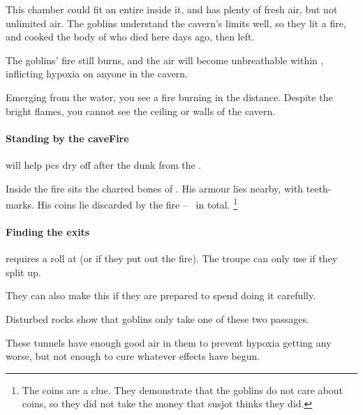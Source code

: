 \begin{multicols}{2}

\begin{exampletext}
  This chamber could fit an entire  inside it, and has plenty of fresh air, but not unlimited air.
  The goblins understand the cavern's limits well, so they lit a fire, and cooked the body of  who died here days ago, then left.
\end{exampletext}

The goblins' fire still burns, and the air will become unbreathable within , inflicting \gls{hypoxia} on anyone in the cavern.

\begin{boxtext}
  Emerging from the water, you see a fire burning in the distance.
  Despite the bright flames, you cannot see the ceiling or walls of the cavern.
\end{boxtext}

\paragraph{Standing by the \gls{caveFire}}
will help \glspl{pc} dry off after the dunk from the .

Inside the fire sits the charred bones of .
His armour lies nearby, with teeth-marks.
His coins lie discarded by the fire -- \lootSmall\ in total.%
\footnote{The coins are a clue.  They demonstrate that the goblins do not care about coins, so they did not take the money that \gls{susjot} thinks they did.}
\label{caveCoinsII}
\setcounter{diceNo}{0}%
\renewcommand\npcsymbol{\currency}

\paragraph{Finding the exits}
requires a  roll at \tn[9] (or \tn[14] if they put out the fire).
The troupe can only use  if they split up.

They can also make this  if they are prepared to spend  doing it carefully.


Disturbed rocks show that goblins only take one of these two passages.

These tunnels have enough good air in them to prevent \gls{hypoxia} getting any worse, but not enough to cure whatever effects have begun.


\end{multicols}
